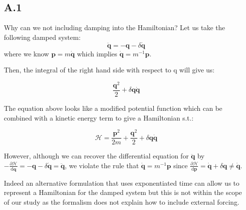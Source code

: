 \documentclass[twoside]{article}
\begin{document}
\subsection*{A.1}

Why can we not including damping into the Hamiltonian? Let us take the following damped system:
\begin{equation}
\ddot{\mathbf{q}} = -\mathbf{q} - \delta\dot{\mathbf{q}}
\end{equation}
where we know $\mathbf{p}=m\dot{\mathbf{q}}$ which implies $\dot{\mathbf{q}} = m^{-1}\mathbf{p}$.

Then, the integral of the right hand side with respect to q will give us:

\begin{equation}
\frac{\mathbf{q}^2}{2} + \delta \mathbf{q} \dot{\mathbf{q}}
\end{equation}

The equation above looks like a modified potential function which can be combined with a kinetic energy term to give a Hamiltonian s.t.:

\begin{equation}
\mathcal{H} =\frac{ \mathbf{p}^2}{2m} + \frac{\mathbf{q}^2}{2} + \delta \mathbf{q} \dot{\mathbf{q}}
\end{equation}

However, although we can recover the differential equation for $\ddot{\mathbf{q}}$ by $-\frac{\partial\mathcal{H}}{\mathrm{d}\mathbf{q}}  =-\mathbf{q} - \delta\dot{\mathbf{q}} = \ddot{\mathbf{q}}$, we violate the rule that $\dot{\mathbf{q}} = m^{-1}\mathbf{p}$ since $ \frac{\partial\mathcal{H}}{\mathrm{d}\mathbf{p}} =  \dot{\mathbf{q}} +\delta \mathbf{q} \neq \dot{\mathbf{q}} $.

Indeed an alternative formulation that uses exponentiated time can allow us to represent a Hamiltonian for the damped system but this is not within the scope of our study as the formalism does not explain how to include external forcing.

\begin{table}[ht!]
\caption{Test Rollout MSE} 
\centering %
\label{tab:tests}
\end{table}




\pagebreak


\end{document}
